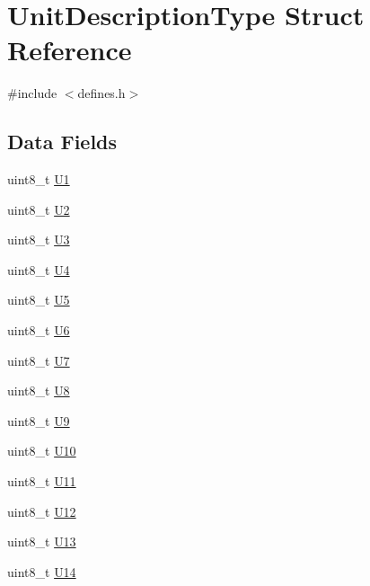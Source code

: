\hypertarget{structUnitDescriptionType}{}\section{Unit\+Description\+Type Struct Reference}
\label{structUnitDescriptionType}


{\ttfamily \#include $<$defines.\+h$>$}

\subsection*{Data Fields}
\begin{DoxyCompactItemize}
\item 
uint8\+\_\+t \hyperlink{structUnitDescriptionType_a3752aa69edf4c75a4d7a00cead8074a4}{U1}
\item 
uint8\+\_\+t \hyperlink{structUnitDescriptionType_ac6fad13d43afdf94c34b6f3a304a7005}{U2}
\item 
uint8\+\_\+t \hyperlink{structUnitDescriptionType_ab3e64923796c7974898273319bc0356a}{U3}
\item 
uint8\+\_\+t \hyperlink{structUnitDescriptionType_af67d7027e3b93c0d1c6c9e316c31da52}{U4}
\item 
uint8\+\_\+t \hyperlink{structUnitDescriptionType_ab11845623074981c46cbe7af4a5964cd}{U5}
\item 
uint8\+\_\+t \hyperlink{structUnitDescriptionType_a8c7c9b56c879d736a289183fcee17b84}{U6}
\item 
uint8\+\_\+t \hyperlink{structUnitDescriptionType_a9b90dfa70ea1e381a0ea6032ca804ad6}{U7}
\item 
uint8\+\_\+t \hyperlink{structUnitDescriptionType_adea079c655e18cac88ad05a8243f22f8}{U8}
\item 
uint8\+\_\+t \hyperlink{structUnitDescriptionType_a23817cabba1909bcf5a0732ed5da1351}{U9}
\item 
uint8\+\_\+t \hyperlink{structUnitDescriptionType_a2751eba36a1207fbeed39f8c1b99dd17}{U10}
\item 
uint8\+\_\+t \hyperlink{structUnitDescriptionType_a73d351d321ae6bbcd5ad8c14c96ad0a8}{U11}
\item 
uint8\+\_\+t \hyperlink{structUnitDescriptionType_a31d9700085a4dcf3e0d2298e8c877f5f}{U12}
\item 
uint8\+\_\+t \hyperlink{structUnitDescriptionType_a686a531e040eca159c41bba7705d8963}{U13}
\item 
uint8\+\_\+t \hyperlink{structUnitDescriptionType_a4a6129e1bed33bf743895f5864208cc0}{U14}

\end{DoxyCompactItemize}
